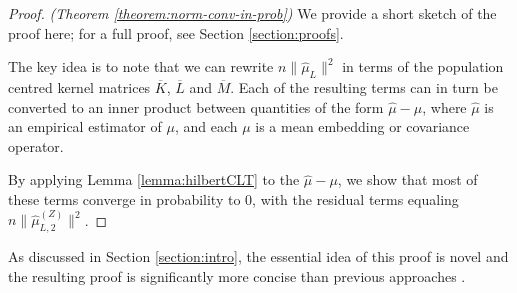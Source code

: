 \documentclass[]{article}
\begin{document}
\begin{proof}\textit{(Theorem \ref{theorem:norm-conv-in-prob})}
We provide a short sketch of the proof here; for a full proof, see Section \ref{section:proofs}.

The key idea is to note that we can rewrite $n\|\hat \mu_L\|^2$ in terms of the population centred kernel matrices $\overline{K}$, $\overline{L}$ and $\overline{M}$. Each of the resulting terms can in turn be converted to an inner product between quantities of the form $\hat\mu - \mu$, where $\hat\mu$ is an empirical estimator of $\mu$, and each $\mu$ is a mean embedding or covariance operator.

By applying Lemma \ref{lemma:hilbertCLT} to the $\hat\mu - \mu$, we show that most of these terms converge in probability to 0, with the residual terms equaling $n\| \hat \mu^{(Z)}_{L,2} \|^2$.
\end{proof}
As discussed in Section \ref{section:intro}, the essential idea of this proof is novel and the resulting proof is significantly more concise than previous approaches \citep{chwialkowski2014kernel,chwialkowski2014wild}. 
\end{document}

